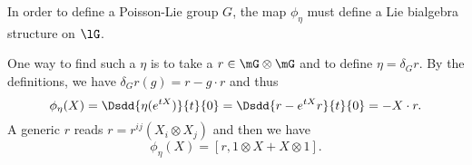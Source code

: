 \begin{theorem}
    In order to define a Poisson-Lie group $G$, the map $\phi_{\eta}$ must define a Lie bialgebra structure on \( \lG\).
\end{theorem}


One way to find such a $\eta$ is to take a $r\in\mG\otimes\mG$ and to define $\eta=\delta_Gr$. By the definitions, we have $\delta_Gr(g)=r-g\cdot r$ and thus
\[ 
  \phi_{\eta}(X)=\Dsdd{ \eta( e^{tX}) }{t}{0}=\Dsdd{ r- e^{tX}r }{t}{0}=-X\cdot r.
\]
A generic $r$ reads $r=r^{ij}(X_i\otimes X_j)$ and then we have
\begin{equation}
\phi_{\eta}(X)=[r,1\otimes X+X\otimes 1].
\end{equation}
